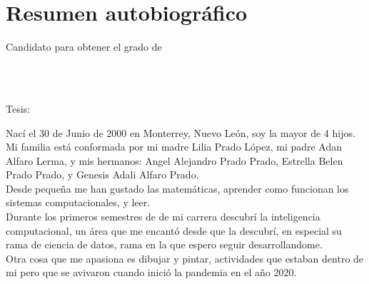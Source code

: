 
\chapter*{Resumen autobiográfico}
\thispagestyle{empty}

\begin{center}
\autor

Candidato para obtener el grado de\\
\grado\\
\orientacion\bigskip

\uanl\\
\fime\bigskip

Tesis:\\
\textsc{\large\titulo}
\end{center}\bigskip

Nací el 30 de Junio de 2000 en Monterrey, Nuevo León, soy la mayor de 4 hijos. Mi familia está conformada por mi madre Lilia Prado López, mi padre Adan Alfaro Lerma, y mis hermanos: Angel Alejandro Prado Prado, Estrella Belen Prado Prado, y Genesis Adali Alfaro Prado. \\
Desde pequeña me han gustado las matemáticas, aprender como funcionan los sistemas computacionales, y leer. \\
Durante los primeros semestres de de mi carrera descubrí la inteligencia computacional, un área que me encantó desde que la descubrí, en especial su rama de ciencia de datos, rama en la que espero seguir desarrollandome. \\
Otra cosa que me apasiona es dibujar y pintar, actividades que estaban dentro de mi pero que se avivaron cuando inició la pandemia en el año 2020.